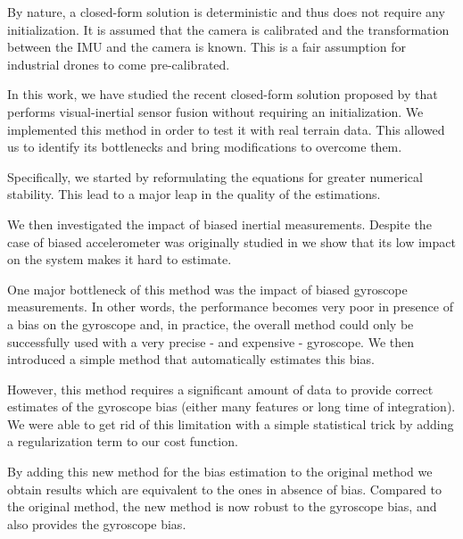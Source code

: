 \documentclass[letterpaper, 10 pt, conference]{ieeeconf}  %
\begin{document}
By nature, a closed-form solution is deterministic and thus does not require any initialization.
It is assumed that the camera is calibrated and the transformation between the IMU and the camera is known.
This is a fair assumption for industrial drones to come pre-calibrated.

In this work, we have studied the recent closed-form solution proposed by \cite{Martinelli2014} that performs visual-inertial sensor fusion without requiring an initialization.
We implemented this method in order to test it with real terrain data.
This allowed us to identify its bottlenecks and bring modifications to overcome them.

Specifically, we started by reformulating the equations for greater numerical stability.
This lead to a major leap in the quality of the estimations.

We then investigated the impact of biased inertial measurements.
Despite the case of biased accelerometer was originally studied in \cite{Martinelli2014} we show that its low impact on the system makes it hard to estimate.

One major bottleneck of this method was the impact of biased gyroscope measurements.
In other words, the performance becomes very poor in presence of a bias on the gyroscope and, in practice, the overall method could only be successfully used with a very precise - and expensive - gyroscope.
We then introduced a simple method that automatically estimates this bias.

However, this method requires a significant amount of data to provide correct estimates of the gyroscope bias (either many features or long time of integration).
We were able to get rid of this limitation with a simple statistical trick by adding a regularization term to our cost function.

By adding this new method for the bias estimation to the original method we obtain results which are equivalent to the ones in absence of bias.
Compared to the original method, the new method is now robust to the gyroscope bias, and also provides the gyroscope bias.


\end{document}
